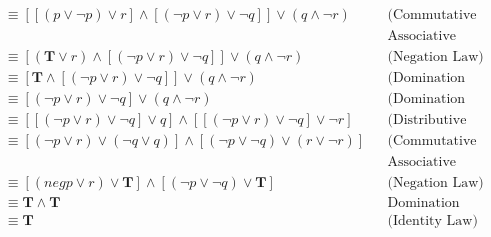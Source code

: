 \begin{itemize}
\begin{enumerate}[a.]
\begin{align*}
                         & \equiv [[(p \lor \neg p) \lor r] \land [(\neg p \lor r) \lor \neg q]] \lor (q \land \neg r)     &  & \text{(Commutative \&}          \\
                         &                                                                                                 &  & \text{Associative Law)}         \\
                         & \equiv [(\mathbf{T} \lor r) \land [(\neg p \lor r) \lor \neg q]] \lor (q \land \neg r)          &  & \text{(Negation Law)}           \\
                         & \equiv [\mathbf{T} \land [(\neg p \lor r) \lor \neg q]] \lor (q \land \neg r)                   &  & \text{(Domination Law)}         \\
                         & \equiv [(\neg p \lor r) \lor \neg q] \lor (q \land \neg r)                                      &  & \text{(Domination Law)}         \\
                         & \equiv [[(\neg p \lor r) \lor \neg q] \lor q] \land [[(\neg p \lor r) \lor \neg q] \lor \neg r] &  & \text{(Distributive Law)}       \\
                         & \equiv [(\neg p \lor r) \lor (\neg q \lor q)] \land [(\neg p \lor \neg q) \lor (r \lor \neg r)] &  & \text{(Commutative \&}          \\
                         &                                                                                                 &  & \text{Associative Law)}         \\
                         & \equiv [(neg p \lor r) \lor \mathbf{T}] \land [(\neg p \lor \neg q) \lor \mathbf{T}]            &  & \text{(Negation Law)}           \\
                         & \equiv \mathbf{T} \land \mathbf{T}                                                              &  & \text{Domination Law}           \\
                         & \equiv \mathbf{T}                                                                               &  & \text{(Identity Law)}           \\
                    \end{align*}


\end{enumerate}
\end{itemize}
